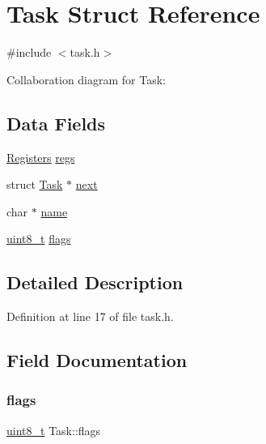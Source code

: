 \hypertarget{a00151}{}\section{Task Struct Reference}
\label{a00151}


{\ttfamily \#include $<$task.\+h$>$}



Collaboration diagram for Task\+:
\subsection*{Data Fields}
\begin{DoxyCompactItemize}
\item 
\hyperlink{a00147}{Registers} \hyperlink{a00151_a136b243ee52ff89e9ba97f4e4dba19bb_a136b243ee52ff89e9ba97f4e4dba19bb}{regs}
\item 
struct \hyperlink{a00151}{Task} $\ast$ \hyperlink{a00151_a8b6b50960a19f7bae344ef0cc8ec4e7d_a8b6b50960a19f7bae344ef0cc8ec4e7d}{next}
\item 
char $\ast$ \hyperlink{a00151_a9cf84d1792cda878178fd3691e472b97_a9cf84d1792cda878178fd3691e472b97}{name}
\item 
\hyperlink{a00104_aba7bc1797add20fe3efdf37ced1182c5_aba7bc1797add20fe3efdf37ced1182c5}{uint8\+\_\+t} \hyperlink{a00151_a9f83f1da7a5a83aa9a5e4849b66db8c5_a9f83f1da7a5a83aa9a5e4849b66db8c5}{flags}
\end{DoxyCompactItemize}


\subsection{Detailed Description}


Definition at line 17 of file task.\+h.



\subsection{Field Documentation}
\mbox{\label{a00151_a9f83f1da7a5a83aa9a5e4849b66db8c5_a9f83f1da7a5a83aa9a5e4849b66db8c5}} 
\subsubsection{\texorpdfstring{flags}{flags}}
{\footnotesize\ttfamily \hyperlink{a00104_aba7bc1797add20fe3efdf37ced1182c5_aba7bc1797add20fe3efdf37ced1182c5}{uint8\+\_\+t} Task\+::flags}



